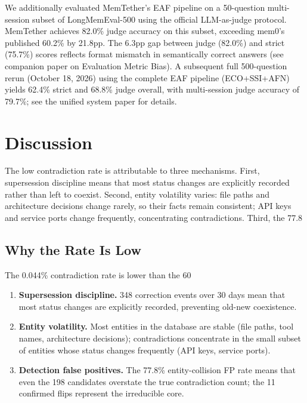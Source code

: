 \documentclass{article}
\begin{document}
We additionally evaluated MemTether's EAF pipeline on a 50-question multi-session subset of LongMemEval-500 using the official LLM-as-judge protocol. MemTether achieves 82.0\% judge accuracy on this subset, exceeding mem0's published 60.2\% by 21.8pp. The 6.3pp gap between judge (82.0\%) and strict (75.7\%) scores reflects format mismatch in semantically correct answers (see companion paper on Evaluation Metric Bias). A subsequent full 500-question rerun (October 18, 2026) using the complete EAF pipeline (ECO+SSI+AFN) yields 62.4\% strict and 68.8\% judge overall, with multi-session judge accuracy of 79.7\%; see the unified system paper for details.

\section{Discussion}
\label{sec:disc}

The low contradiction rate is attributable to three mechanisms. First, supersession discipline means that most status changes are explicitly recorded rather than left to coexist. Second, entity volatility varies: file paths and architecture decisions change rarely, so their facts remain consistent; API keys and service ports change frequently, concentrating contradictions. Third, the 77.8%

\subsection{Why the Rate Is Low}
The 0.044\% contradiction rate is lower than the 60%

\begin{enumerate}
\item \textbf{Supersession discipline.} 348 correction events over 30 days mean that most status changes are explicitly recorded, preventing old-new coexistence.
\item \textbf{Entity volatility.} Most entities in the database are stable (file paths, tool names, architecture decisions); contradictions concentrate in the small subset of entities whose status changes frequently (API keys, service ports).
\item \textbf{Detection false positives.} The 77.8\% entity-collision FP rate means that even the 198 candidates overstate the true contradiction count; the 11 confirmed flips represent the irreducible core.
\end{enumerate}
\end{document}
